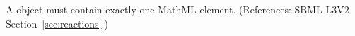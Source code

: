 A \KineticLaw object must contain exactly one MathML  element.
(References: SBML L3V2 Section~\ref{sec:reactions}.)
